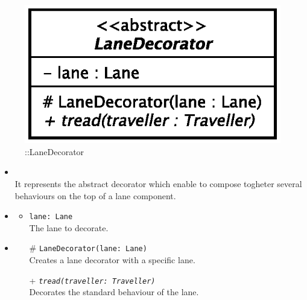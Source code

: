 \begin{figure}[h]
\centering
\includegraphics[scale=0.6,keepaspectratio]{images/solution/app/backend/lane_decorator.eps}
\caption{\pReactiveComponentLaneDecoration::LaneDecorator}
\label{fig:sd-app-lane_decorator}
\end{figure}
\FloatBarrier
\begin{itemize}
  \item \textbf{\descr} \\
    It represents the abstract decorator which enable to compose togheter several
behaviours on the top of a lane component. 
  \item \textbf{\attrs}
  \begin{itemize}
    \item \texttt{lane: Lane} \\
The lane to decorate.
  \end{itemize}
  \item \textbf{\ops}
   \begin{itemize} 
   \item[\#] \texttt{LaneDecorator(lane: Lane)} \\
Creates a lane decorator with a specific lane.
    \item[+] \texttt{\textit{tread(traveller: Traveller)}} \\
Decorates the standard behaviour of the lane.  
  \end{itemize}
\end{itemize}
